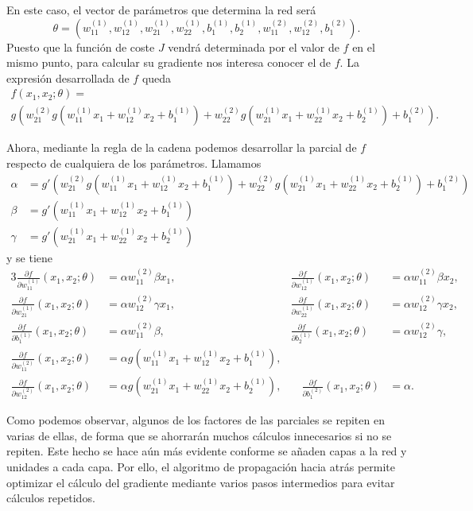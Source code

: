 \begin{example}
En este caso, el vector de parámetros que determina la red será
$$\theta=\left(w_{11}^{(1)},w_{12}^{(1)},w_{21}^{(1)},w_{22}^{(1)},b_{1}^{(1)},b_{2}^{(1)},w_{11}^{(2)},w_{12}^{(2)},b_{1}^{(2)}\right).$$
Puesto que la función de coste $J$ vendrá determinada por el valor de $f$ en el mismo punto, para calcular su gradiente nos interesa conocer el de $f$. La expresión desarrollada de $f$ queda
\begin{gather*}
f(x_1,x_2;\theta)=\\g\left(w_{21}^{(2)}g\left(w_{11}^{(1)}x_{1}+w_{12}^{(1)}x_2+b_1^{(1)}\right)+w_{22}^{(2)}g\left(w_{21}^{(1)}x_1+w_{22}^{(1)}x_2+b_2^{(1)}\right)+b_1^{(2)}\right).
\end{gather*}

Ahora, mediante la regla de la cadena podemos desarrollar la parcial de $f$ respecto de cualquiera de los parámetros. Llamamos
\begin{align*}
  \alpha&=g'\left(w_{21}^{(2)} g\left(w_{11}^{(1)}x_{1}+w_{12}^{(1)}x_2+b_1^{(1)}\right) + w_{22}^{(2)} g\left(w_{21}^{(1)}x_1+w_{22}^{(1)}x_2+b_2^{(1)}\right)+b_1^{(2)}\right)\\
  \beta&=g'\left(w_{11}^{(1)}x_{1}+w_{12}^{(1)}x_2+b_1^{(1)}\right)\\
  \gamma&=g'\left(w_{21}^{(1)}x_{1}+w_{22}^{(1)}x_2+b_2^{(1)}\right)
\end{align*}
y se tiene
\begin{alignat*}{3}
  \frac{\partial f}{\partial w_{11}^{(1)}}(x_1,x_2;\theta)&=\alpha w_{11}^{(2)}\beta x_1,\quad&
  \frac{\partial f}{\partial w_{12}^{(1)}}(x_1,x_2;\theta)&=\alpha w_{11}^{(2)}\beta x_2,\\
  \frac{\partial f}{\partial w_{21}^{(1)}}(x_1,x_2;\theta)&=\alpha w_{12}^{(2)}\gamma x_1,\quad&
  \frac{\partial f}{\partial w_{22}^{(1)}}(x_1,x_2;\theta)&=\alpha w_{12}^{(2)}\gamma x_2,\\
  \frac{\partial f}{\partial b_{1}^{(1)}}(x_1,x_2;\theta)&=\alpha w_{11}^{(2)}\beta, \quad&
  \frac{\partial f}{\partial b_{2}^{(1)}}(x_1,x_2;\theta)&=\alpha w_{12}^{(2)}\gamma, \\
  \frac{\partial f}{\partial w_{11}^{(2)}}(x_1,x_2;\theta)&=\alpha g(w_{11}^{(1)}x_{1}+w_{12}^{(1)}x_2 + b_1^{(1)}),&&\\
  \frac{\partial f}{\partial w_{12}^{(2)}}(x_1,x_2;\theta)&=\alpha g(w_{21}^{(1)}x_{1}+w_{22}^{(1)}x_2 + b_2^{(1)}),&\quad
  \frac{\partial f}{\partial b_{1}^{(2)}}(x_1,x_2;\theta)&=\alpha.
\end{alignat*}

Como podemos observar, algunos de los factores de las parciales se repiten en varias de ellas, de forma que se ahorrarán muchos cálculos innecesarios si no se repiten. Este hecho se hace aún más evidente conforme se añaden capas a la red y unidades a cada capa. Por ello, el algoritmo de propagación hacia atrás permite optimizar el cálculo del gradiente mediante varios pasos intermedios para evitar cálculos repetidos.

\end{example}

